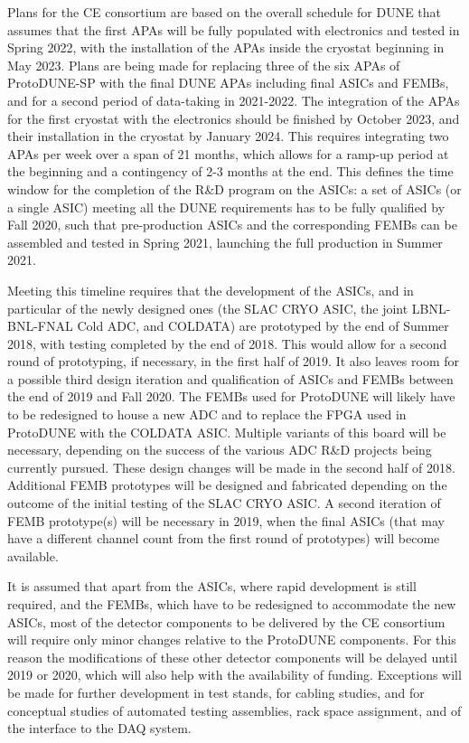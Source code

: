 Plans for the CE consortium are based on the overall schedule for DUNE
that assumes that the first APAs will be fully populated with electronics
and tested in Spring 2022, with the installation of
the APAs inside the cryostat beginning in May 2023. Plans are being made
for replacing three of the six APAs of ProtoDUNE-SP with the final DUNE 
APAs including final ASICs and FEMBs, and for a second period of
data-taking in 2021-2022. The integration of the
APAs for the first cryostat with the electronics should be finished by
October 2023, and their installation in the cryostat by January 2024.
This requires integrating two APAs per week over a span of 21 months,
which allows for a ramp-up period at the beginning and a contingency of
2-3 months at the end. This defines the time window for the completion of
the R\&D program on the ASICs: a set of ASICs (or a single ASIC) meeting
all the DUNE requirements has to be fully qualified by Fall 2020, such
that pre-production ASICs and the corresponding FEMBs can be assembled and
tested in Spring 2021, launching the full production in Summer 2021.

Meeting this timeline requires that the development of the ASICs, and in particular
of the newly designed ones (the SLAC CRYO ASIC, the joint LBNL-BNL-FNAL Cold ADC,
and COLDATA) are prototyped by the end of Summer 2018, with testing
completed by the end of 2018. This would allow for a second round of prototyping,
if necessary, in the first half of 2019. It also leaves room for a possible
third design iteration and qualification of ASICs and FEMBs between the
end of 2019 and Fall 2020. The FEMBs used for ProtoDUNE will
likely have to be redesigned to house a new ADC and to replace the FPGA used
in ProtoDUNE with the COLDATA ASIC. Multiple variants of this board will be
necessary, depending on the success of the various ADC R\&D projects being currently
pursued. These design changes will be made in the second half of 2018.
Additional FEMB prototypes will be designed and fabricated depending on
the outcome of the initial testing of the SLAC CRYO ASIC. A second iteration
of FEMB prototype(s) will be necessary in 2019, when the final ASICs (that
may have a different channel count from the first round of prototypes) will become
available. 

It is assumed that apart from the ASICs, where rapid development is still
required, and the FEMBs, which have to be redesigned to accommodate the
new ASICs, most of the detector components to be delivered by the CE consortium
will require only minor changes relative to the ProtoDUNE components. For
this reason the modifications of these other detector components will
be delayed until 2019 or 2020, which will also help with the availability of funding.
Exceptions will be made for further development in test stands, for cabling
studies, and for conceptual studies of automated testing assemblies, rack space
assignment, and of the interface to the DAQ system.
